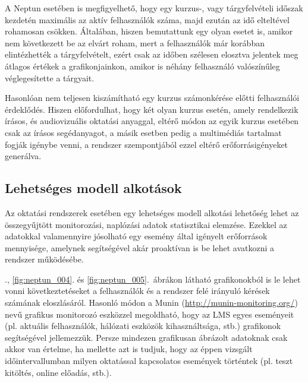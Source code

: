 A Neptun esetében is megfigyelhető, hogy egy kurzus-, vagy tárgyfelvételi időszak kezdetén maximális az aktív felhasználók száma, majd ezután az idő elteltével rohamosan csökken. Általában, hiszen bemutattunk egy olyan esetet is, amikor nem következett be az elvárt roham, mert a felhasználók már korábban elintézhették a tárgyfelvételt, ezért csak az időben szélesen elosztva jelentek meg átlagos értékek a grafikonjainkon, amikor is néhány felhasználó valószínűleg véglegesítette a tárgyait.

Hasonlóan nem teljesen kiszámítható egy kurzus számonkérése előtti felhasználói érdeklődés. Hiszen előfordulhat, hogy két olyan kurzus esetén, amely rendelkezik írásos, és audiovizuális oktatási anyaggal, eltérő módon az egyik kurzus esetében csak az írásos segédanyagot, a másik esetben pedig a multimédiás tartalmat fogják igénybe venni, a rendszer szempontjából ezzel eltérő erőforrásigényeket generálva.

\subsection{Lehetséges modell alkotások}

Az oktatási rendszerek esetében egy lehetséges modell alkotási lehetőség lehet az összegyűjtött monitorozási, naplózási adatok statisztikai elemzése. Ezekkel az adatokkal valamennyire jósolható egy esemény által igényelt erőforrások mennyisége, amelynek segítségével akár proaktívan is be lehet avatkozni a rendszer működésébe.

., \ref{fig:neptun_004}. és \ref{fig:neptun_005}.~ábrákon látható grafikonokból is le lehet vonni következtetéseket a felhasználók és a rendszer felé irányuló kérések számának eloszlásáról. Hasonló módon a Munin (\href{http://munin-monitoring.org/}{http://munin-monitoring.org/}) nevű grafikus monitorozó eszközzel megoldható, hogy az LMS egyes eseményeit (pl. aktuális felhasználók, hálózati eszközök kihasználtsága, stb.) grafikonok segítségével jellemezzük. Persze mindezen grafikusan ábrázolt adatoknak csak akkor van értelme, ha mellette azt is tudjuk, hogy az éppen vizsgált időintervallumban milyen oktatással kapcsolatos események történtek (pl. teszt kitöltés, online előadás, stb.). 
